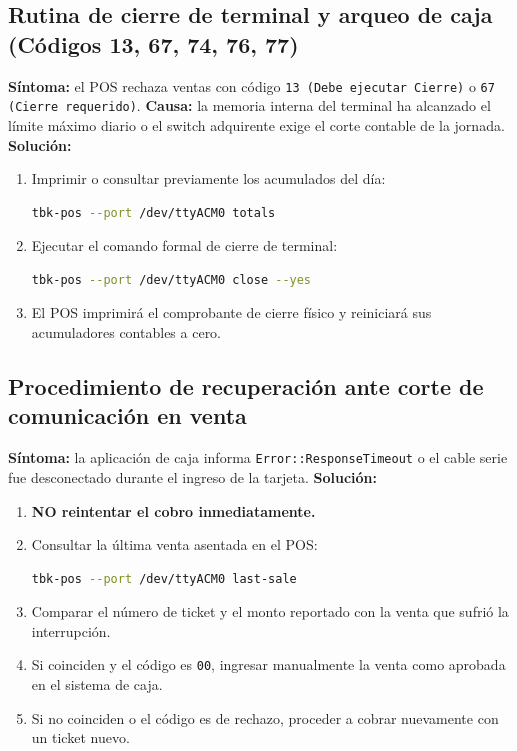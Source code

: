 \documentclass{../../plantilla/raysac-informe}
\begin{document}
\subsection{Rutina de cierre de terminal y arqueo de caja (Códigos 13, 67, 74, 76, 77)}
\textbf{Síntoma:} el POS rechaza ventas con código \texttt{13 (Debe ejecutar Cierre)} o \texttt{67 (Cierre requerido)}.
\textbf{Causa:} la memoria interna del terminal ha alcanzado el límite máximo diario o el switch adquirente
exige el corte contable de la jornada.
\textbf{Solución:}
\begin{enumerate}
  \item Imprimir o consultar previamente los acumulados del día:
\begin{lstlisting}[language=bash]
tbk-pos --port /dev/ttyACM0 totals
\end{lstlisting}
  \item Ejecutar el comando formal de cierre de terminal:
\begin{lstlisting}[language=bash]
tbk-pos --port /dev/ttyACM0 close --yes
\end{lstlisting}
  \item El POS imprimirá el comprobante de cierre físico y reiniciará sus acumuladores contables a cero.
\end{enumerate}

\subsection{Procedimiento de recuperación ante corte de comunicación en venta}
\textbf{Síntoma:} la aplicación de caja informa \texttt{Error::ResponseTimeout} o el cable serie fue desconectado
durante el ingreso de la tarjeta.
\textbf{Solución:}
\begin{enumerate}
  \item \textbf{NO reintentar el cobro inmediatamente.}
  \item Consultar la última venta asentada en el POS:
\begin{lstlisting}[language=bash]
tbk-pos --port /dev/ttyACM0 last-sale
\end{lstlisting}
  \item Comparar el número de ticket y el monto reportado con la venta que sufrió la interrupción.
  \item Si coinciden y el código es \texttt{00}, ingresar manualmente la venta como aprobada en el sistema de caja.
  \item Si no coinciden o el código es de rechazo, proceder a cobrar nuevamente con un ticket nuevo.
\end{enumerate}
\end{document}
